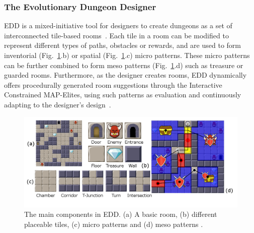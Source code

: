 \subsubsection{The Evolutionary Dungeon Designer}
EDD is a mixed-initiative tool for designers to create dungeons as a set of interconnected tile-based rooms~\cite{p7alvarexempowering}. Each tile in a room can be modified to represent different types of paths, obstacles or rewards, and are used to form inventorial (Fig.~\ref{fig:tiles}.b) or spatial (Fig.~\ref{fig:tiles}.c) micro patterns. These micro patterns can be further combined to form meso patterns (Fig.~\ref{fig:tiles}.d) such as treasure or guarded rooms. Furthermore, as the designer creates rooms, EDD dynamically offers procedurally generated room suggestions through the Interactive Constrained MAP-Elites, using such patterns as evaluation and continuously adapting to the designer's design~\cite{p7Alvarez2020-ICMAPE}.

\begin{figure}[]
  \centering
  \includegraphics[width=\columnwidth]{included-papers-tex/paper-7/Figures/figure1.png}
  \caption{The main components in EDD. (a) A basic room, (b) different placeable tiles, (c) micro patterns and (d) meso patterns \cite{p7Alvarez2018a}.}
  \label{fig:tiles}
\end{figure}


